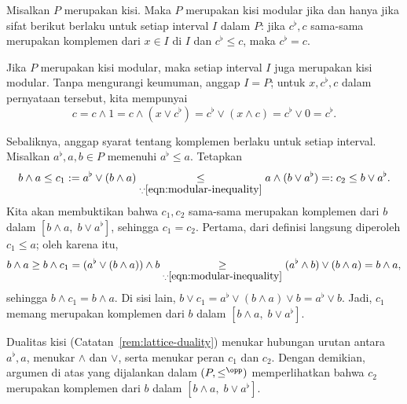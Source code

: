 \begin{lema}\label{prop:modularity-criterion}
	Misalkan $P$ merupakan kisi. Maka $P$ merupakan kisi modular jika dan hanya
	jika sifat berikut berlaku untuk setiap interval $I$ dalam $P$: jika
	$c^\flat,c$ sama-sama merupakan komplemen dari $x \in I$ di $I$ dan
	$c^\flat \leq c$, maka $c^\flat=c$.
\end{lema}
\begin{bukti}
	Jika $P$ merupakan kisi modular, maka setiap interval $I$ juga merupakan
	kisi modular. Tanpa mengurangi keumuman, anggap $I=P$; untuk
	$x,c^\flat,c$ dalam pernyataan tersebut, kita mempunyai
	\[ c = c \wedge 1 = c \wedge (x \vee c^\flat) = c^\flat \vee (x \wedge c) = c^\flat \vee 0 = c^\flat . \]

	Sebaliknya, anggap syarat tentang komplemen berlaku untuk setiap interval.
	Misalkan $a^\flat,a,b \in P$ memenuhi $a^\flat \leq a$. Tetapkan
	\[ b \wedge a \leq c_1 := a^\flat \vee (b \wedge a) \underset{\because \eqref{eqn:modular-inequality}}{\leq} a \wedge (b \vee a^\flat) =: c_2 \leq b \vee a^\flat. \]
	Kita akan membuktikan bahwa $c_1,c_2$ sama-sama merupakan komplemen dari
	$b$ dalam $\left[b \wedge a,\; b \vee a^\flat\right]$, sehingga
	$c_1=c_2$. Pertama, dari definisi langsung diperoleh $c_1 \leq a$; oleh
	karena itu,
	\[ b \wedge a \geq b \wedge c_1 = (a^\flat \vee (b \wedge a)) \wedge b \underset{\because \eqref{eqn:modular-inequality}}{\geq} (a^\flat \wedge b) \vee (b \wedge a) = b \wedge a , \]
	sehingga $b \wedge c_1=b \wedge a$. Di sisi lain,
	$b \vee c_1=a^\flat \vee (b \wedge a) \vee b=a^\flat \vee b$. Jadi,
	$c_1$ memang merupakan komplemen dari $b$ dalam
	$\left[b \wedge a,\; b \vee a^\flat\right]$.

	Dualitas kisi (Catatan~\ref{rem:lattice-duality}) menukar hubungan urutan
	antara $a^\flat,a$, menukar $\wedge$ dan $\vee$, serta menukar peran $c_1$
	dan $c_2$. Dengan demikian, argumen di atas yang dijalankan dalam
	$(P,\leq^{\opp})$ memperlihatkan bahwa $c_2$ merupakan komplemen dari $b$
	dalam $\left[b \wedge a,\; b \vee a^\flat\right]$.
\end{bukti}

